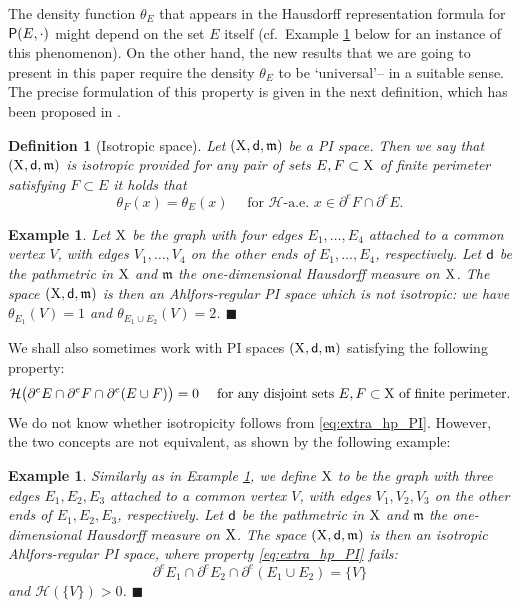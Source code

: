 \documentclass[reqno]{amsart}
\numberwithin{equation}{section}
\newcommand{\X}{{\rm X}}
\newcommand{\sfd}{{\sf d}}
\newcommand{\mm}{\mathfrak m}
\newcommand{\1}{\mathbbm 1}
\renewcommand{\P}{{\sf P}}
\renewcommand{\H}{{\mathcal H}}
\newcommand{\fr}{\penalty-20\null\hfill\(\blacksquare\)}
\newtheorem{definition}[theorem]{Definition}
\newtheorem{example}[theorem]{Example}
\begin{document}
%
%
The density function \(\theta_E\) that appears in the Hausdorff representation
formula for \(\P(E,\cdot)\) might depend on the set \(E\) itself (cf.\ Example
\ref{ex:non_isotropic} below for an instance of this phenomenon). On the other
hand, the new results that we are going to present in this paper require the
density \(\theta_E\) to be `universal'-- in a suitable sense. The precise
formulation of this property is given in the next definition, which has been
proposed in \cite[Definition 6.1]{AMP04}.
%
%
\begin{definition}[Isotropic space]
Let \((\X,\sfd,\mm)\) be a PI space. Then we say that \((\X,\sfd,\mm)\) is
\emph{isotropic} provided for any pair of sets \(E,F\subset\X\) of finite perimeter
satisfying \(F\subset E\) it holds that
\begin{equation}\label{eq:isotropic_def}
\theta_F(x)=\theta_E(x)\quad\text{ for }\H\text{-a.e.\ }x\in\partial^e F\cap\partial^e E.
\end{equation}
\end{definition}
%
%
\begin{example}\label{ex:non_isotropic}{\rm
Let \(\X\) be the graph with four edges \(E_1,\ldots, E_4\) attached to a common
vertex \(V\), with edges \(V_1,\ldots,V_4\) on the other ends of \(E_1,\ldots,E_4\),
respectively. Let \(\sfd\) be the pathmetric in \(\X\) and \(\mm\) the one-dimensional
Hausdorff measure on \(\X\). The space \((\X,\sfd,\mm)\) is then an Ahlfors-regular PI
space which is not isotropic: we have \(\theta_{E_1}(V)=1\) and
\(\theta_{E_1\cup E_2}(V)=2\).
\fr}\end{example}
%
%
We shall also sometimes work with PI spaces \((\X,\sfd,\mm)\)
satisfying the following property:
\begin{equation}\label{eq:extra_hp_PI}
\H\big(\partial^e E\cap\partial^e F\cap\partial^e(E\cup F)\big)=0
\quad\text{ for any disjoint sets }E,F\subset\X\text{ of finite perimeter.}
\end{equation}
We do not know whether isotropicity follows from \eqref{eq:extra_hp_PI}.
However, the two concepts are not equivalent, as shown by the following example:
%
%
\begin{example}\label{ex:extra_hp_fails}{\rm
Similarly as in Example \ref{ex:non_isotropic}, we define \(\X\) to be the graph
with three edges \(E_1,E_2,E_3\) attached to a common vertex \(V\), with edges
\(V_1,V_2,V_3\) on the other ends of \(E_1,E_2,E_3\), respectively. Let \(\sfd\) be
the pathmetric in \(\X\) and \(\mm\) the one-dimensional Hausdorff measure on \(\X\).
The space \((\X,\sfd,\mm)\) is then an isotropic Ahlfors-regular PI space,
where property \eqref{eq:extra_hp_PI} fails:
\[
\partial^e E_1\cap\partial^e E_2\cap\partial^e(E_1\cup E_2)=\{V\}
\]
and \(\H(\{V\})>0\).
\fr}\end{example}
\end{document}
